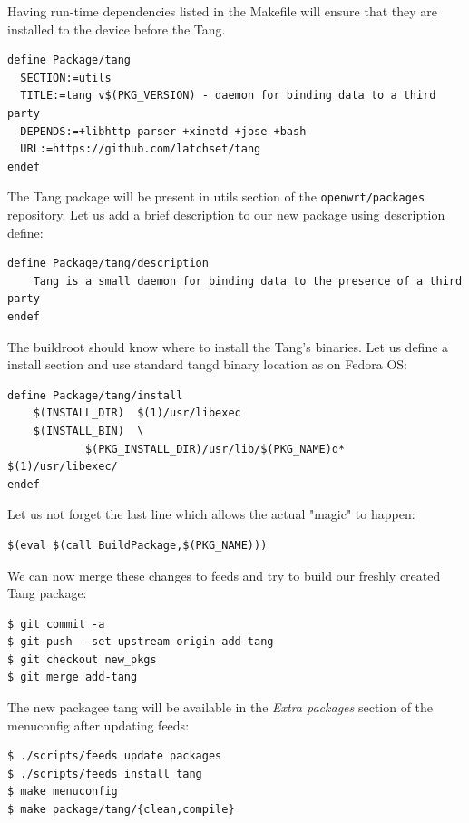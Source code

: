 Having run-time dependencies listed in the Makefile will ensure that they are installed to the device before the Tang.
\begin{lstlisting}[columns=fixed,basicstyle=\ttfamily\footnotesize,tabsize=4,backgroundcolor=\color{yellow!10}]
define Package/tang
  SECTION:=utils
  TITLE:=tang v$(PKG_VERSION) - daemon for binding data to a third party
  DEPENDS:=+libhttp-parser +xinetd +jose +bash
  URL:=https://github.com/latchset/tang
endef
\end{lstlisting}
The Tang package will be present in utils section of the {\tt openwrt/packages} repository.
Let us add a brief description to our new package using description define:
\begin{lstlisting}[columns=fixed,basicstyle=\ttfamily\footnotesize,tabsize=4,backgroundcolor=\color{yellow!10}]
define Package/tang/description
	Tang is a small daemon for binding data to the presence of a third party
endef
\end{lstlisting}
The buildroot should know where to install the Tang's binaries.
Let us define a install section and use standard tangd binary location as on Fedora OS:
\begin{lstlisting}[columns=fixed,basicstyle=\ttfamily\footnotesize,tabsize=4,backgroundcolor=\color{yellow!10}]
define Package/tang/install
	$(INSTALL_DIR)	$(1)/usr/libexec
	$(INSTALL_BIN)	\
			$(PKG_INSTALL_DIR)/usr/lib/$(PKG_NAME)d*	$(1)/usr/libexec/
endef
\end{lstlisting}
Let us not forget the last line which allows the actual "magic" to happen:
\begin{lstlisting}[columns=fixed,basicstyle=\ttfamily\footnotesize,tabsize=4,backgroundcolor=\color{yellow!10}]
$(eval $(call BuildPackage,$(PKG_NAME)))
\end{lstlisting}
We can now merge these changes to feeds and try to build our freshly created Tang package:
\begin{lstlisting}[columns=fixed,basicstyle=\ttfamily\footnotesize,tabsize=4,backgroundcolor=\color{yellow!10}]
$ git commit -a
$ git push --set-upstream origin add-tang
$ git checkout new_pkgs
$ git merge add-tang
\end{lstlisting}
The new packagee tang will be available in the {\it Extra packages} section of the menuconfig after updating feeds:
\begin{lstlisting}[columns=fixed,basicstyle=\ttfamily\footnotesize,tabsize=4,backgroundcolor=\color{yellow!10}]
$ ./scripts/feeds update packages
$ ./scripts/feeds install tang
$ make menuconfig
$ make package/tang/{clean,compile}
\end{lstlisting}
